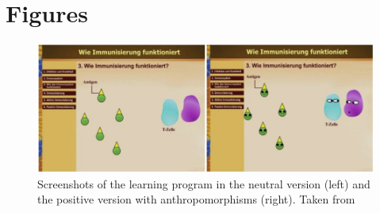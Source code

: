 \section{Figures}

\begin{figure}[h!]
	\centering
	\includegraphics[width=1\linewidth]{graphics/anthropomorphisms}
	\caption{Screenshots of the learning program in the neutral version (left) and the positive version with anthropomorphisms (right). Taken from \cite{Park2015}}
	\label{fig:anthropomorphisms}
\end{figure}